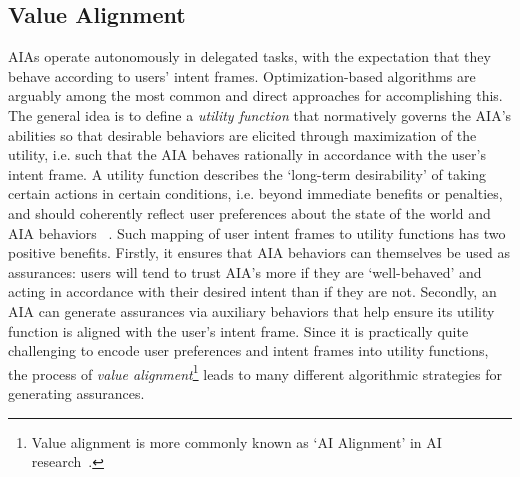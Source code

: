 

\subsection{Value Alignment} \label{sec:value_alignment}
AIAs operate autonomously in delegated tasks, with the expectation that they behave according to users' intent frames. 
Optimization-based algorithms are arguably among the most common and direct approaches for accomplishing this. 
The general idea is to define a \emph{utility function} that normatively governs the AIA's abilities so that desirable behaviors are elicited through maximization of the utility, i.e. such that the AIA behaves rationally in accordance with the user's intent frame. 
A utility function describes the `long-term desirability' of taking certain actions in certain conditions, i.e. beyond immediate benefits or penalties, and should coherently reflect user preferences about the state of the world and AIA behaviors ~\cite{Russell2010-wv}. 
Such mapping of user intent frames to utility functions has two positive benefits. 
Firstly, it ensures that AIA behaviors can themselves be used as assurances: users will tend to trust AIA's more if they are `well-behaved' and acting in accordance with their desired intent than if they are not. 
Secondly, an AIA can generate assurances via auxiliary behaviors that help ensure its utility function is aligned with the user's intent frame.  Since it is practically quite challenging to encode user preferences and intent frames into utility functions, the process of \emph{value alignment}\footnote{Value alignment is more commonly known as `AI Alignment' in AI research~\cite{Yudkowsky2001-hb,Bensinger2014-ul}.} leads to many different algorithmic strategies for generating assurances. 

